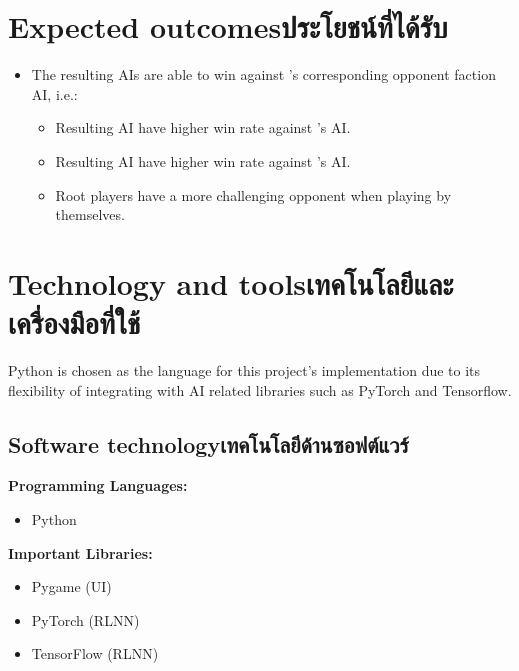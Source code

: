 \section{\ifenglish Expected outcomes\else ประโยชน์ที่ได้รับ\fi}
\begin{itemize}
    \item The resulting AIs are able to win against \RootV{}'s corresponding opponent faction AI, i.e.:
    \begin{itemize}
        \item Resulting \Marquise{} AI have higher win rate against \RootV{}'s \Eyrie{} AI.
        \item Resulting \Eyrie{} AI have higher win rate against \RootV{}'s \Marquise{} AI.
    \item Root players have a more challenging opponent when playing by themselves.
    \end{itemize}
\end{itemize}

\section{\ifenglish Technology and tools\else เทคโนโลยีและเครื่องมือที่ใช้\fi}
Python is chosen as the language for this project's implementation due to its flexibility of integrating with AI related libraries such as PyTorch and Tensorflow. 


\subsection{\ifenglish Software technology\else เทคโนโลยีด้านซอฟต์แวร์\fi}
\textbf{Programming Languages:}
\begin{itemize}
    \item Python
\end{itemize}
\textbf{Important Libraries:}
\begin{itemize}
    \item Pygame (UI) 
    \item PyTorch (RLNN)
    \item TensorFlow (RLNN)
\end{itemize}

